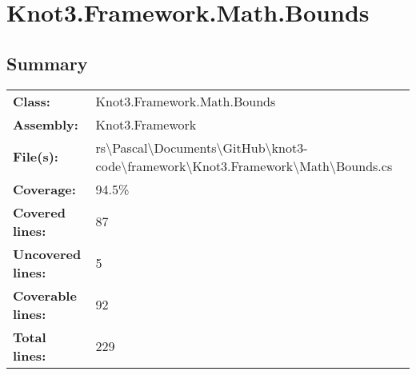 \documentclass[a4paper,10pt]{article}
\begin{document}
\section{Knot3.Framework.Math.Bounds}
\subsection{Summary}
\begin{longtable}[l]{ll}
\textbf{Class:} & Knot3.Framework.Math.Bounds\\
\textbf{Assembly:} & Knot3.Framework\\
\textbf{File(s):} & \begin{minipage}[t]{12cm}{rs\textbackslash Pascal\textbackslash Documents\textbackslash GitHub\textbackslash knot3-code\textbackslash framework\textbackslash Knot3.Framework\textbackslash Math\textbackslash Bounds.cs}\end{minipage} \\
\textbf{Coverage:} & 94.5\%\\
\textbf{Covered lines:} & 87\\
\textbf{Uncovered lines:} & 5\\
\textbf{Coverable lines:} & 92\\
\textbf{Total lines:} & 229\\
\end{longtable}
\end{document}
